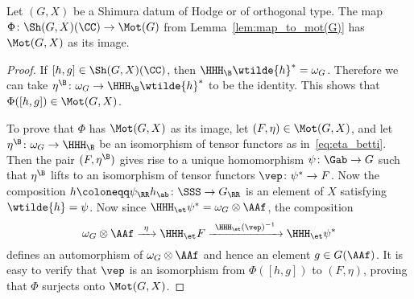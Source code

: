 \begin{proposition}
    Let $(G,X)$ be a Shimura datum of Hodge or of orthogonal type. The map $\Phi\colon \Sh(G,X)(\CC) \rightarrow \Mot(G)$ from Lemma~\ref{lem:map_to_mot(G)} has $\Mot(G,X)$ as its image.
\end{proposition}
\begin{proof}
If $[h,g] \in \Sh(G,X)(\CC)$, then $\HHH_{\B} \wtilde{h}^* = \omega_G$. Therefore we can take $\eta^{\B}\colon \omega_G \rightarrow \HHH_{\B} \wtilde{h}^*$ to be the identity. This shows that $\Phi([h,g]) \in \Mot(G,X)$.

To prove that $\Phi$ has $\Mot(G,X)$ as its image, let $(F,\eta) \in \Mot(G,X)$, and let $\eta^{\B}\colon \omega_G \rightarrow \HHH_{\B}$ be an isomorphism of tensor functors as in~\eqref{eq:eta_betti}. Then the pair $(F,\eta^{\B})$ gives rise to a unique homomorphism $\psi\colon \Gab \rightarrow G$ such that $\eta^{\B}$ lifts to an isomorphism of tensor functors $\vep\colon \psi^* \rightarrow F$. Now the composition $h \coloneqq \psi_{\RR} h_{\ab}\colon \SSS \rightarrow G_{\RR}$ is an element of $X$ satisfying $\wtilde{h} = \psi$. Now since $\HHH_{\et} \psi^* = \omega_G \otimes \AAf$, the composition
$$
\omega_G \otimes \AAf \xrightarrow{\ \eta \ } \HHH_{\et} F \xrightarrow{\ \HHH_{\et}(\vep)^{-1} \ } \HHH_{\et} \psi^*
$$
defines an automorphism of $\omega_G \otimes \AAf$ and hence an element $g \in G(\AAf)$. It is easy to verify that $\vep$ is an isomorphism from $\Phi([h,g])$ to $(F,\eta)$, proving that $\Phi$ surjects onto $\Mot(G,X)$.
\end{proof}

